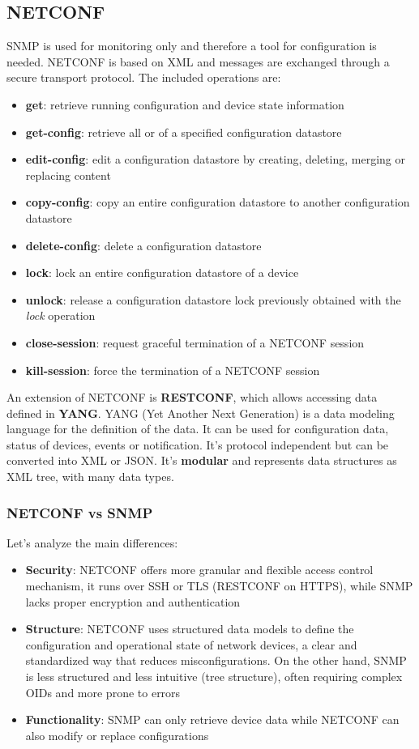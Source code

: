 \subsection{NETCONF}
SNMP is used for monitoring only and therefore a tool for configuration is needed. NETCONF is based on XML and messages are exchanged through a secure transport protocol. The included operations are:
\begin{itemize}
	\item \textbf{get}: retrieve running configuration and device state information
	\item \textbf{get-config}: retrieve all or of a specified configuration datastore
	\item \textbf{edit-config}: edit a configuration datastore by creating, deleting, merging or replacing content
	\item \textbf{copy-config}: copy an entire configuration datastore to another configuration datastore
	\item \textbf{delete-config}: delete a configuration datastore
	\item \textbf{lock}: lock an entire configuration datastore of a device
	\item \textbf{unlock}: release a configuration datastore lock previously obtained with the \textit{lock} operation
	\item \textbf{close-session}: request graceful termination of a NETCONF session
	\item \textbf{kill-session}: force the termination of a NETCONF session 
\end{itemize}

An extension of NETCONF is \textbf{RESTCONF}, which allows accessing data defined in \textbf{YANG}. YANG (Yet Another Next Generation) is a data modeling language for the definition of the data. It can be used for configuration data, status of devices, events or notification. It's protocol independent but can be converted into XML or JSON. It's \textbf{modular} and represents data structures as XML tree, with many data types.
\subsubsection{NETCONF vs SNMP}
Let's analyze the main differences:
\begin{itemize}
	\item \textbf{Security}: NETCONF offers more granular and flexible access control mechanism, it runs over SSH or TLS (RESTCONF on HTTPS), while SNMP lacks proper encryption and authentication
	\item \textbf{Structure}: NETCONF uses structured data models to define the configuration and operational state of network devices, a clear and standardized way that reduces misconfigurations. On the other hand, SNMP is less structured and less intuitive (tree structure), often requiring complex OIDs and more prone to errors
	\item \textbf{Functionality}: SNMP can only retrieve device data while NETCONF can also modify or replace configurations
\end{itemize}